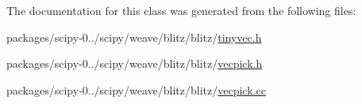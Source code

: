 The documentation for this class was generated from the following files\+:\begin{DoxyCompactItemize}
\item 
packages/scipy-\/0../scipy/weave/blitz/blitz/\hyperlink{tinyvec_8h}{tinyvec.\+h}\item 
packages/scipy-\/0../scipy/weave/blitz/blitz/\hyperlink{vecpick_8h}{vecpick.\+h}\item 
packages/scipy-\/0../scipy/weave/blitz/blitz/\hyperlink{vecpick_8cc}{vecpick.\+cc}\end{DoxyCompactItemize}
